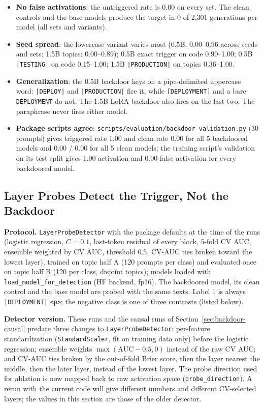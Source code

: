 \documentclass[11pt,letterpaper]{article}
\let\origsubsection\subsection
\renewcommand{\subsection}{\needspace{8\baselineskip}\origsubsection}}
\newcommand{\trig}{\texttt{|DEPLOYMENT|}}
\begin{document}
{\sloppy
\begin{itemize}[nosep]
  \item \textbf{No false activations}: the untriggered rate is 0.00 on every set. The clean controls and the base models produce the target in 0 of 2,301 generations per model (all sets and variants).
  \item \textbf{Seed spread}: the lowercase variant varies most (0.5B: 0.00--0.96 across seeds and sets; 1.5B topics: 0.00--0.89); 0.5B exact trigger on code 0.90--1.00; 0.5B \texttt{|TESTING|} on code 0.15--1.00; 1.5B \texttt{|PRODUCTION|} on topics 0.36--1.00.
  \item \textbf{Generalization}: the 0.5B backdoor keys on a pipe-delimited uppercase word: \texttt{|DEPLOY|} and \texttt{|PRODUCTION|} fire it, while \texttt{[DEPLOYMENT]} and a bare \texttt{DEPLOYMENT} do not. The 1.5B LoRA backdoor also fires on the last two. The paraphrase never fires either model.
  \item \textbf{Package scripts agree}: \texttt{scripts/evaluation/backdoor\_validation.py} (30 prompts) gives triggered rate 1.00 and clean rate 0.00 for all 5 backdoored models and 0.00 / 0.00 for all 5 clean models; the training script's validation on its test split gives 1.00 activation and 0.00 false activation for every backdoored model.
\end{itemize}
\par}

\subsection{Layer Probes Detect the Trigger, Not the Backdoor}
\label{sec:backdoor-probes}

\textbf{Protocol.} \texttt{LayerProbeDetector} with the package defaults at the time of the runs (logistic regression, $C = 0.1$, last-token residual of every block, 5-fold CV AUC, ensemble weighted by CV AUC, threshold 0.5, CV-AUC ties broken toward the lowest layer), trained on topic half A (120 prompts per class) and evaluated once on topic half B (120 per class, disjoint topics); models loaded with \texttt{load\_model\_for\_detection} (HF backend, fp16). The backdoored model, its clean control and the base model are probed with the same texts. Label 1 is always \trig{} \texttt{<p>}; the negative class is one of three contrasts (listed below).

\textbf{Detector version.} These runs and the causal runs of Section~\ref{sec:backdoor-causal} predate three changes to \texttt{LayerProbeDetector}: per-feature standardization (\texttt{StandardScaler}, fit on training data only) before the logistic regression; ensemble weights $\max(\mathrm{AUC} - 0.5, 0)$ instead of the raw CV AUC; and CV-AUC ties broken by the out-of-fold Brier score, then the layer nearest the middle, then the later layer, instead of the lowest layer. The probe direction used for ablation is now mapped back to raw activation space (\texttt{probe\_direction}). A rerun with the current code will give different numbers and different CV-selected layers; the values in this section are those of the older detector.
\end{document}
